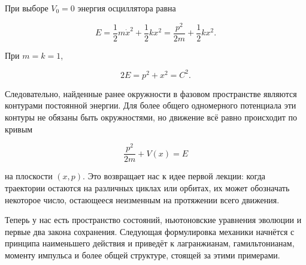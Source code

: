 При выборе \(V_0=0\) энергия осциллятора равна

\begin{equation}
  E=\frac12m\dot x^2+\frac12kx^2
   =\frac{p^2}{2m}+\frac12kx^2.
  \label{eq:oscillator-energy}
\end{equation}

При \(m=k=1\),

\begin{equation}
  2E=p^2+x^2=C^2.
  \label{eq:oscillator-energy-circle}
\end{equation}

Следовательно, найденные ранее окружности в фазовом пространстве являются контурами постоянной энергии.  Для более общего одномерного потенциала эти контуры не обязаны быть окружностями, но движение всё равно происходит по кривым

\begin{equation}
  \frac{p^2}{2m}+V(x)=E
  \label{eq:general-energy-contour}
\end{equation}

на плоскости \((x,p)\).  Это возвращает нас к идее первой лекции: когда траектории остаются на различных циклах или орбитах, их может обозначать некоторое число, остающееся неизменным на протяжении всего движения.

Теперь у нас есть пространство состояний, ньютоновские уравнения эволюции и первые два закона сохранения.  Следующая формулировка механики начнётся с принципа наименьшего действия и приведёт к лагранжианам, гамильтонианам, моменту импульса и более общей структуре, стоящей за этими примерами.

\begin{classroomqa}
\end{classroomqa}